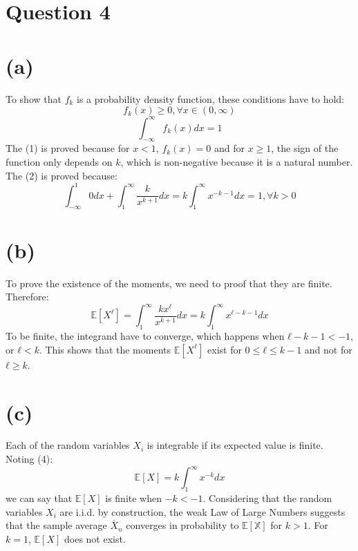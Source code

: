 \documentclass{article}
\date{November 2024}
\begin{document}
\maketitle

\section{Question 4}
\section{(a)}
To show that \(f_k\) is a probability density function, these conditions have to hold:
\[f_k(x) \geq 0, \forall x \in (0,\infty) \tag{1}\]
\[
\int_{-\infty}^{\infty} f_k(x)dx =1 \tag{2}
\]
The (1) is proved because for \(x<1\), \(f_k(x)=0\) and for \(x \geq 1\), the sign of the function only depends on \(k\), which is non-negative because it is a natural number.
The (2) is proved because: \[
\int_{-\infty}^{1} 0 dx + \int_{1}^{\infty}\frac{k}{x^{k+1}}dx=k\int_{1}^{ \infty}x^{-k-1}dx=1, \forall k>0 \tag{3}
\]
\section{(b)}
To prove the existence of the moments, we need to proof that they are finite. Therefore:
\[
\mathbb{E}[X^ℓ] = \int_{1}^{\infty}\frac{kx^ℓ}{x^{k+1}}dx=k\int_{1}^{\infty}x^{ℓ-k-1}dx \tag{4}
\]
To be finite, the integrand have to converge, which happens when \(ℓ-k-1<-1\), or \(ℓ<k\). This shows that the moments \(\mathbb{E}[X^ℓ]\) exist for \(0 \leq ℓ\leq k-1\) and not for \(ℓ\geq k\).
\section{(c)}
Each of the random variables \(X_i\) is integrable if its expected value is finite. Noting (4):\[
\mathbb{E}[X]=k\int_{1}^{\infty}x^{-k}dx \tag{5}
\]
we can say that \(\mathbb{E}[X]\) is finite when \(-k<-1\). Considering that the random variables \(X_i\) are i.i.d. by construction, the weak Law of Large Numbers suggests that the sample average \(\overline{X}_n\) converges in probability to \(\mathbb{E[X]}\) for \(k>1\). For \(k=1\), \(\mathbb{E}[X]\) does not exist.
\end{document}
